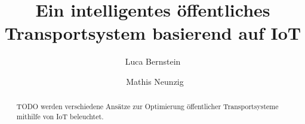 \documentclass[ngerman]{seminarbeitrag} %
\begin{document}
\title{Ein intelligentes öffentliches Transportsystem basierend auf IoT}
\author{Luca Bernstein\and\ Mathis Neunzig}

\maketitle %

\setcounter{tocdepth}{2}
\tableofcontents{}
\newpage

\begin{abstract}
TODO werden verschiedene Ansätze zur Optimierung öffentlicher Transportsysteme mithilfe von IoT beleuchtet.

\end{abstract}

\pagebreak


\pagebreak


\pagebreak


\pagebreak


\pagebreak


\pagebreak



\end{document}
